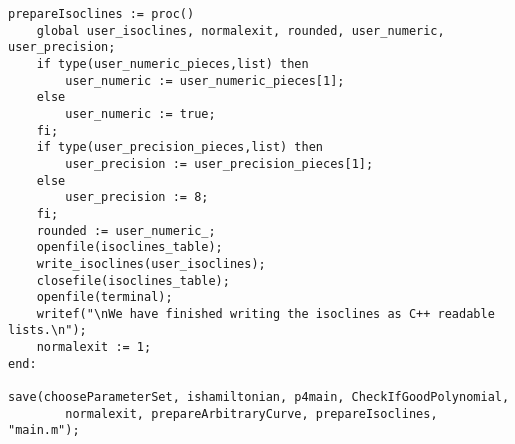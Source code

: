 \documentclass[a4paper,10pt]{article}
\begin{document}
\begin{lstlisting}[name=main]
prepareIsoclines := proc()
    global user_isoclines, normalexit, rounded, user_numeric, user_precision;
    if type(user_numeric_pieces,list) then
        user_numeric := user_numeric_pieces[1];
    else
        user_numeric := true;
    fi;
    if type(user_precision_pieces,list) then
        user_precision := user_precision_pieces[1];
    else
        user_precision := 8;
    fi;
    rounded := user_numeric_;
    openfile(isoclines_table);
    write_isoclines(user_isoclines);
    closefile(isoclines_table);
    openfile(terminal);
    writef("\nWe have finished writing the isoclines as C++ readable lists.\n");
    normalexit := 1;
end:

save(chooseParameterSet, ishamiltonian, p4main, CheckIfGoodPolynomial,
        normalexit, prepareArbitraryCurve, prepareIsoclines, "main.m");


\end{lstlisting}
\end{document}
